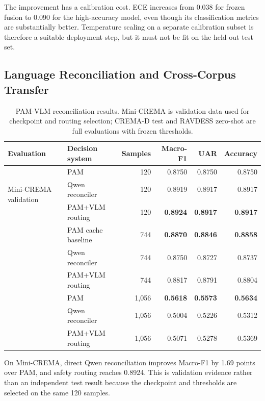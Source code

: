\documentclass[conference]{IEEEtran}
\begin{document}
The improvement has a calibration cost. ECE increases from 0.038 for frozen
fusion to 0.090 for the high-accuracy model, even though its classification
metrics are substantially better. Temperature scaling on a separate
calibration subset is therefore a suitable deployment step, but it must not be
fit on the held-out test set.

\subsection{Language Reconciliation and Cross-Corpus Transfer}

\begin{table}[t]
\centering
\caption{PAM-VLM reconciliation results. Mini-CREMA is validation data used
for checkpoint and routing selection; CREMA-D test and RAVDESS zero-shot are
full evaluations with frozen thresholds.}
\label{tab:vlm}
\small
\setlength{\tabcolsep}{8pt}
\begin{tabular}{llrrrr}
\toprule
\textbf{Evaluation} & \textbf{Decision system} & \textbf{Samples}
& \textbf{Macro-F1} & \textbf{UAR} & \textbf{Accuracy} \\
\midrule
\multirow{3}{*}{Mini-CREMA validation}
  & PAM & 120 & 0.8750 & 0.8750 & 0.8750 \\
  & Qwen reconciler & 120 & 0.8919 & 0.8917 & 0.8917 \\
  & PAM+VLM routing & 120 & \textbf{0.8924} & \textbf{0.8917} & \textbf{0.8917} \\
\addlinespace[2pt]
\multirow{3}{*}{CREMA-D held-out test}
  & PAM cache baseline & 744 & \textbf{0.8870} & \textbf{0.8846} & \textbf{0.8858} \\
  & Qwen reconciler & 744 & 0.8750 & 0.8727 & 0.8737 \\
  & PAM+VLM routing & 744 & 0.8817 & 0.8791 & 0.8804 \\
\addlinespace[2pt]
\multirow{3}{*}{RAVDESS zero-shot}
  & PAM & 1,056 & \textbf{0.5618} & \textbf{0.5573} & \textbf{0.5634} \\
  & Qwen reconciler & 1,056 & 0.5004 & 0.5226 & 0.5312 \\
  & PAM+VLM routing & 1,056 & 0.5071 & 0.5278 & 0.5369 \\
\bottomrule
\end{tabular}
\end{table}

On Mini-CREMA, direct Qwen reconciliation improves Macro-F1 by 1.69 points
over PAM, and safety routing reaches 0.8924. This is validation evidence
rather than an independent test result because the checkpoint and thresholds
are selected on the same 120 samples.
\end{document}
